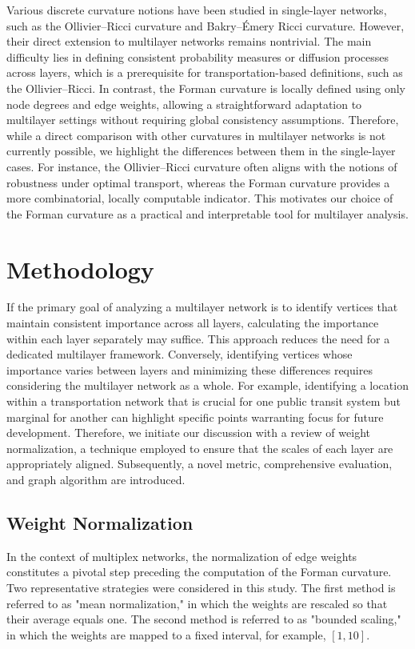 \documentclass[preprint,12pt,number]{elsarticle}
\theoremstyle{plain} %
\theoremstyle{definition} %
\begin{document}
Various discrete curvature notions have been studied in single-layer networks, such as the Ollivier–Ricci curvature and Bakry–Émery Ricci curvature. However, their direct extension to multilayer networks remains nontrivial. The main difficulty lies in defining consistent probability measures or diffusion processes across layers, which is a prerequisite for transportation-based definitions, such as the Ollivier–Ricci. In contrast, the Forman curvature is locally defined using only node degrees and edge weights, allowing a straightforward adaptation to multilayer settings without requiring global consistency assumptions.
Therefore, while a direct comparison with other curvatures in multilayer networks is not currently possible, we highlight the differences between them in the single-layer cases. For instance, the Ollivier–Ricci curvature often aligns with the notions of robustness under optimal transport, whereas the Forman curvature provides a more combinatorial, locally computable indicator. This motivates our choice of the Forman curvature as a practical and interpretable tool for multilayer analysis.

\section{Methodology}
If the primary goal of analyzing a multilayer network is to identify vertices that maintain consistent importance across all layers, calculating the importance within each layer separately may suffice. This approach reduces the need for a dedicated multilayer framework. Conversely, identifying vertices whose importance varies between layers and minimizing these differences requires considering the multilayer network as a whole. For example, identifying a location within a transportation network that is crucial for one public transit system but marginal for another can highlight specific points warranting focus for future development. Therefore, we initiate our discussion with a review of weight normalization, a technique employed to ensure that the scales of each layer are appropriately aligned. Subsequently, a novel metric, comprehensive evaluation, and graph algorithm are introduced.

\subsection{Weight Normalization}
In the context of multiplex networks, the normalization of edge weights constitutes a pivotal step preceding the computation of the Forman curvature. Two representative strategies were considered in this study. The first method is referred to as "mean normalization," in which the weights are rescaled so that their average equals one. The second method is referred to as "bounded scaling," in which the weights are mapped to a fixed interval, for example, $[1,10]$.
\end{document}
